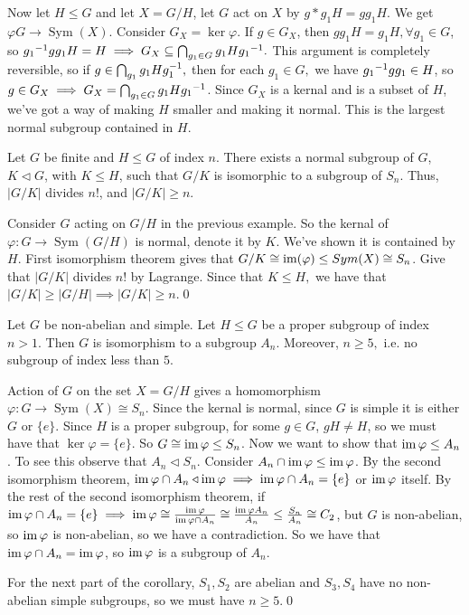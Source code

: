 \documentclass{article}
\newcommand{\nrm}{\triangleleft}
\DeclareMathOperator{\sym}{Sym}
\begin{document}
\par
Now let $ H\le G $ and let $ X=G/H $, let $ G $ act on $ X $ by $ g*g_1H=gg_1 H $. We get $ \varphi G\to\sym(X) $. Consider $ G_X=\ker \varphi $. If $ g\in G_X $, then $ gg_1H=g_1H, \forall g_1\in G $, so $ {g_1}^{-1}gg_1 H=H\implies G_X\subseteq \bigcap_{g_1\in G} g_1H{g_1}^{-1}.$ This argument is completely reversible, so if $ g\in\bigcap_{g_1}g_1H{g}^{-1}_1, $ then for each $ g_1\in G, $ we have $ {g_1}^{-1}gg_1\in H $, so $ g\in G_X\implies G_X=\bigcap_{g_1\in G}g_1H{g_1}^{-1} $. Since $ G_X $ is a kernal and is a subset of $ H $, we've got a way of making $ H $ smaller and making it normal. This is the largest normal subgroup contained in $ H $.
\begin{theorem}
	  Let $ G $ be finite and $ H\le G $ of index $ n $. There exists a normal subgroup of $ G $, $ K\nrm G $, with $ K\le H $, such that $ G/K $ is isomorphic to a subgroup of $ S_n $. Thus, $ |G/K| $ divides $ n! $, and $ |G/K|\ge n$.
\end{theorem}
\pf Consider $ G $ acting on $ G/H $ in the previous example. So the kernal of $ \varphi:G\to\sym(G/H) $ is normal, denote it by $ K $. We've shown it is contained by $ H $. First isomorphism theorem gives that $ G/K\cong \operatorname{im}(\varphi)\le Sym(X)\cong S_n $. Give that $ |G/K| $ divides $ n! $ by Lagrange. Since that $ K\le H, $ we have that $ |G/K|\ge |G/H|\implies |G/K|\ge n $.\qed
\begin{corollary}
	  Let $ G $ be non-abelian and simple. Let $ H\le G $ be a proper subgroup of index $ n>1 $. Then $ G $ is isomorphism to a subgroup $ A_n $. Moreover, $ n\ge 5, $ i.e. no subgroup of index less than $ 5 $.
\end{corollary}
\pf Action of $ G $ on the set $ X=G/H $ gives a homomorphism $ \varphi:G\to \sym(X)\cong S_n $. Since the kernal is normal, since $ G $ is simple it is either $ G $ or $ \{e\} $. Since $ H $ is a proper subgroup, for some $ g\in G $, $ gH\ne H $, so we must have that $ \ker \varphi=\{e\} $. So $ G\cong \operatorname{im}\varphi\le S_n $. Now we want to show that $ \operatorname{im}\varphi\le A_n $. To see this observe that $ A_n\nrm S_n $. Consider $ A_n\cap \operatorname{im}\varphi\le \operatorname{im}\varphi $. By the second isomorphism theorem, $ \ima\varphi\cap A_n\nrm \ima\varphi\implies\ima\varphi\cap A_n=\{e\} $ or $ \operatorname{im}\varphi $ itself. By the rest of the second isomorphism theorem, if $ \operatorname{im}\varphi\cap A_n=\{e\}\implies \operatorname{im}\varphi\cong\frac{\operatorname{im}\varphi}{\operatorname{im}\varphi\cap A_n}\cong \frac{\operatorname{im}\varphi A_n}{A_n}\le \frac{S_n}{A_n} \cong C_2 $, but $ G $ is non-abelian, so $ \operatorname{im} \varphi $ is non-abelian, so we have a contradiction. So we have that $ \operatorname{im}\varphi\cap A_n =\operatorname{im}\varphi $, so $ \operatorname{im} \varphi $ is a subgroup of $ A_n $.\par
For the next part of the corollary, $ S_1,S_2 $ are abelian and $ S_3,S_4 $ have no non-abelian simple subgroups, so we must have $ n\ge 5 $.\qed
\end{document}
